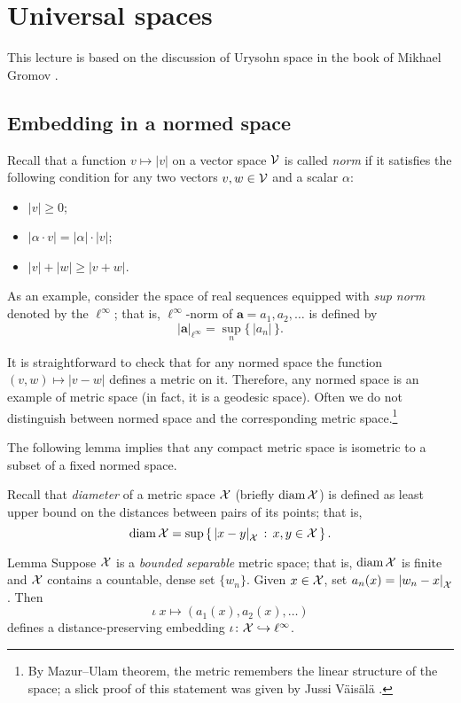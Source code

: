 \chapter{Universal spaces}

This lecture is based on the discussion of Urysohn space in the book of Mikhael Gromov \cite{gromov-2007}.

\section{Embedding in a normed space}

Recall that a function $v\mapsto |v|$ on a vector space $\mathcal{V}$ is called \emph{norm} if it satisfies the following condition for any two vectors $v,w\in \mathcal{V}$ and a scalar $\alpha$:
\begin{itemize}
\item $|v|\ge 0$;
\item $|\alpha\cdot v|=|\alpha|\cdot |v|$;
\item $|v|+|w|\ge|v+w|$.
\end{itemize}

As an example, consider the space of real sequences equipped with \emph{sup norm} denoted by the $\ell^\infty$; that is, $\ell^\infty$-norm of $\bm{a}=a_1,a_2,\dots$ is defined by
\[|\bm{a}|_{\ell^\infty}=\sup_n\{\,|a_n|\,\}.\]


It is straightforward to check that for any normed space the function $(v,w)\mapsto |v-w|$ defines a metric on it.
Therefore, any normed space is an example of metric space (in fact, it is a geodesic space).
Often we do not distinguish between normed space and the corresponding metric space.\footnote{By Mazur--Ulam theorem, the metric remembers the linear structure of the space; a slick proof of this statement was given by Jussi V\"{a}is\"{a}l\"{a} \cite{vaisala}.}

The following lemma implies that any compact metric space is isometric to a subset of a fixed normed space.

Recall that 
\emph{diameter} of a metric space $\mathcal{X}$ (briefly $\operatorname{\rm diam}\nolimits \mathcal{X}$) is defined as least upper bound on the distances between pairs of its points;
that is,
\[\diam \spc{X}=\sup\set{\dist{x}{y}{\spc{X}}}{x,y\in \spc{X}}.\]



\begin{thm}{Lemma}\label{lem:frechet}
Suppose $\mathcal{X}$ is a \emph{bounded} \emph{separable} metric space;
that is, $\operatorname{\rm diam}\nolimits\mathcal{X}$ is finite and $\mathcal{X}$ contains a countable, dense set $\{w_n\}$.
Given $x\in \mathcal{X}$, set $a_n(x)=\dist{w_n}{x}{\spc{X}}$.
Then 
\[\iota\:x\mapsto (a_1(x), a_2(x),\dots)\]
defines a distance-preserving embedding $\iota\colon\mathcal{X}\hookrightarrow \ell^\infty$.
\end{thm}

